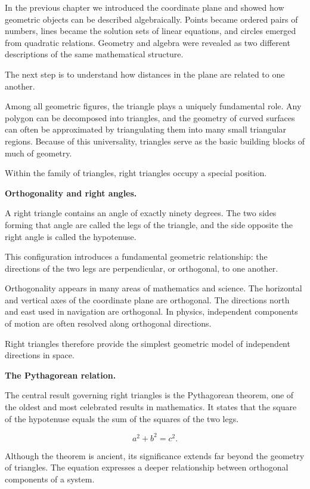\documentclass[11pt, openany]{book}
\theoremstyle{plain}
\theoremstyle{definition}
\theoremstyle{remark}
\begin{document}
In the previous chapter we introduced the coordinate plane and showed
how geometric objects can be described algebraically. Points became
ordered pairs of numbers, lines became the solution sets of linear
equations, and circles emerged from quadratic relations. Geometry and
algebra were revealed as two different descriptions of the same
mathematical structure.

The next step is to understand how distances in the plane are related to
one another.

Among all geometric figures, the triangle plays a uniquely fundamental
role. Any polygon can be decomposed into triangles, and the geometry of
curved surfaces can often be approximated by triangulating them into
many small triangular regions. Because of this universality, triangles
serve as the basic building blocks of much of geometry.

Within the family of triangles, right triangles occupy a special
position.

\medskip

\textbf{Orthogonality and right angles.}

A right triangle contains an angle of exactly ninety degrees. The two
sides forming that angle are called the legs of the triangle, and the
side opposite the right angle is called the hypotenuse.

This configuration introduces a fundamental geometric relationship:
the directions of the two legs are perpendicular, or orthogonal, to one
another.

Orthogonality appears in many areas of mathematics and science. The
horizontal and vertical axes of the coordinate plane are orthogonal.
The directions north and east used in navigation are orthogonal. In
physics, independent components of motion are often resolved along
orthogonal directions.

Right triangles therefore provide the simplest geometric model of
independent directions in space.

\medskip

\textbf{The Pythagorean relation.}

The central result governing right triangles is the Pythagorean theorem,
one of the oldest and most celebrated results in mathematics. It states
that the square of the hypotenuse equals the sum of the squares of the
two legs.

\[
a^2 + b^2 = c^2 .
\]

Although the theorem is ancient, its significance extends far beyond the
geometry of triangles. The equation expresses a deeper relationship
between orthogonal components of a system.
\end{document}
